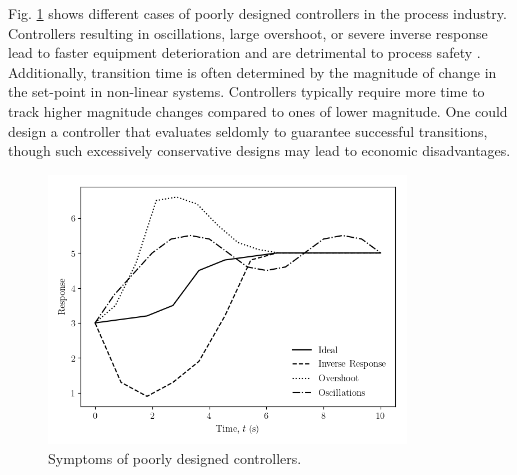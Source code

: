Fig. \ref{fig:inv_overshoot_pid} shows different cases of poorly designed controllers in the process industry. Controllers resulting in oscillations, large overshoot, or severe inverse response lead to faster equipment deterioration and are detrimental to process safety \cite{process_control_ref13}. Additionally, transition time is often determined by the magnitude of change in the set-point in non-linear systems. Controllers typically require more time to track higher magnitude changes compared to ones of lower magnitude.  One could design a controller that evaluates seldomly to guarantee successful transitions, though such excessively conservative designs may lead to economic disadvantages.

\begin{figure}[h]
    \begin{center}
        \includegraphics[width=9.5cm]{images/ftc/inv_overshoot_pid.png}
        \caption{\label{fig:inv_overshoot_pid} Symptoms of poorly designed controllers.}
    \end{center}
\end{figure}

